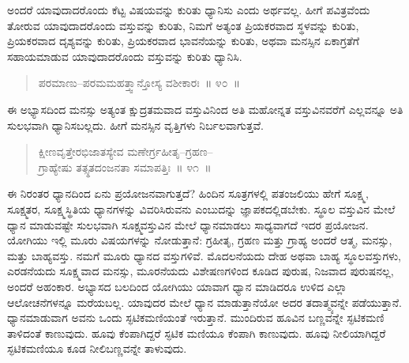 
\vspace{0.1cm}

ಅಂದರೆ ಯಾವುದಾದರೊಂದು ಕೆಟ್ಟ ವಿಷಯವನ್ನು ಕುರಿತು ಧ್ಯಾನಿಸು ಎಂದು ಅರ್ಥವಲ್ಲ. ಹೀಗೆ ಪವಿತ್ರವೆಂದು ತೋರುವ ಯಾವುದಾದರೊಂದು ವಸ್ತುವನ್ನು ಕುರಿತು, ನಿಮಗೆ ಅತ್ಯಂತ ಪ್ರಿಯಕರವಾದ ಸ್ಥಳವನ್ನು ಕುರಿತು, ಪ್ರಿಯಕರವಾದ ದೃಶ್ಯವನ್ನು ಕುರಿತು, ಪ್ರಿಯಕರವಾದ ಭಾವನೆಯನ್ನು ಕುರಿತು, ಅಥವಾ ಮನಸ್ಸಿನ ಏಕಾಗ್ರತೆಗೆ ಸಹಾಯಮಾಡುವ ಯಾವುದಾದರೊಂದು ವಸ್ತುವನ್ನು ಕುರಿತು ಧ್ಯಾನಿಸಿ. 

\vspace{-0.25cm}

\begin{verse}
ಪರಮಾಣು–ಪರಮಮಹತ್ತ್ವಾನ್ತೋಸ್ಯ ವಶೀಕಾರಃ~॥ ೪೦~॥
\end{verse}

\vspace{-0.4cm}


\vspace{0.1cm}

ಈ ಅಭ್ಯಾಸದಿಂದ ಮನಸ್ಸು ಅತ್ಯಂತ ಕ್ಷುದ್ರತಮವಾದ ವಸ್ತುವಿನಿಂದ ಅತಿ ಮಹೋನ್ನತ ವಸ್ತುವಿನವರೆಗೆ ಎಲ್ಲವನ್ನೂ ಅತಿ ಸುಲಭವಾಗಿ ಧ್ಯಾನಿಸಬಲ್ಲದು. ಹೀಗೆ ಮನಸ್ಸಿನ ವೃತ್ತಿಗಳು ನಿರ್ಬಲವಾಗುತ್ತವೆ. 

\vspace{-0.3cm}

\begin{verse}
ಕ್ಷೀಣವೃತ್ತೇರಭಿಜಾತಸ್ಯೇವ ಮಣೇರ್ಗ್ರಹೀತೃ–ಗ್ರಹಣ–\\ಗ್ರಾಹ್ಯೇಷು ತತ್ಸ್ಥತದಂಜನತಾ ಸಮಾಪತ್ತಿಃ~॥ ೪೧~॥
\end{verse}

\vspace{-0.4cm}


\vspace{0.1cm}

ಈ ನಿರಂತರ ಧ್ಯಾನದಿಂದ ಏನು ಪ್ರಯೋಜನವಾಗುತ್ತದೆ? ಹಿಂದಿನ ಸೂತ್ರಗಳಲ್ಲಿ ಪತಂಜಲಿಯು ಹೇಗೆ ಸೂಕ್ಷ್ಮ, ಸೂಕ್ಷ್ಮತರ, ಸೂಕ್ಷ್ಮಸ್ಥಿತಿಯ ಧ್ಯಾನಗಳನ್ನು ವಿವರಿಸಿರುವನು ಎಂಬುದನ್ನು ಜ್ಞಾಪಕದಲ್ಲಿಡಬೇಕು. ಸ್ಥೂಲ ವಸ್ತುವಿನ ಮೇಲೆ ಧ್ಯಾನ ಮಾಡುವಷ್ಟೇ ಸುಲಭವಾಗಿ ಸೂಕ್ಷ್ಮವಸ್ತುವಿನ ಮೇಲೆ ಧ್ಯಾನಮಾಡಲು ಸಾಧ್ಯವಾಗದೆ ಇದರ ಪ್ರಯೋಜನ. ಯೋಗಿಯು ಇಲ್ಲಿ ಮೂರು ವಿಷಯಗಳನ್ನು ನೋಡುತ್ತಾನೆ: ಗ್ರಹೀತೃ, ಗ್ರಹಣ ಮತ್ತು ಗ್ರಾಹ್ಯ ಅಂದರೆ ಆತ್ಮ, ಮನಸ್ಸು, ಮತ್ತು ಬಾಹ್ಯವಸ್ತು. ನಮಗೆ ಮೂರು ಧ್ಯಾನದ ವಸ್ತುಗಳಿವೆ. ಮೊದಲನೆಯದು ದೇಹ ಅಥವಾ ಬಾಹ್ಯ ಸ್ಥೂಲವಸ್ತುಗಳು, ಎರಡನೆಯದು ಸೂಕ್ಷ್ಮವಾದ ಮನಸ್ಸು, ಮೂರನೆಯದು ವಿಶೇಷಣಗಳಿಂದ ಕೂಡಿದ ಪುರುಷ, ನಿಜವಾದ ಪುರುಷನಲ್ಲ, ಅಂದರೆ ಅಹಂಕಾರ. ಅಭ್ಯಾಸದ ಬಲದಿಂದ ಯೋಗಿಯು ಯಾವಾಗ ಧ್ಯಾನ ಮಾಡಿದರೂ ಉಳಿದ ಎಲ್ಲಾ ಆಲೋಚನೆಗಳನ್ನೂ ಮರೆಯಬಲ್ಲ. ಯಾವುದರ ಮೇಲೆ ಧ್ಯಾನ ಮಾಡುತ್ತಾನೆಯೋ ಅದರ ತದಾತ್ಮ್ಯವನ್ನೇ ಪಡೆಯುತ್ತಾನೆ. ಧ್ಯಾನಮಾಡುವಾಗ ಅವನು ಒಂದು ಸ್ಫಟಿಕಮಣಿಯಂತೆ ಇರುತ್ತಾನೆ. ಮುಂದಿರುವ ಹೂವಿನ ಬಣ್ಣವನ್ನೇ ಸ್ಫಟಿಕಮಣಿ ತಾಳಿದಂತೆ ಕಾಣುವುದು. ಹೂವು ಕೆಂಪಾಗಿದ್ದರೆ ಸ್ಫಟಿಕ ಮಣಿಯೂ ಕೆಂಪಾಗಿ ಕಾಣುವುದು. ಹೂವು ನೀಲಿಯಾಗಿದ್ದರೆ ಸ್ಫಟಿಕಮಣಿಯೂ ಕೂಡ ನೀಲಿಬಣ್ಣವನ್ನೇ ತಾಳುವುದು. 

